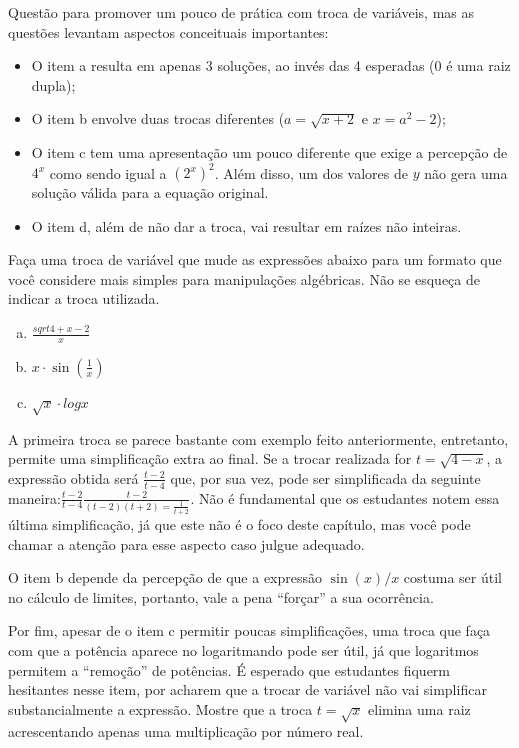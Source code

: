 \documentclass[main_estudante.tex]{subfiles}
\begin{document}
Questão para promover um pouco de prática com troca de variáveis, mas as questões levantam aspectos conceituais importantes:
\begin{itemize}
 \item O item a resulta em apenas 3 soluções, ao invés das 4 esperadas ($0$ é uma raiz dupla);
 \item O item b envolve duas trocas diferentes ($a=\sqrt{x+2}$ e $x=a^2-2$);
 \item O item c tem uma apresentação um pouco diferente que exige a percepção de $4^x$ como sendo igual a $(2^x)^2$. Além disso, um dos valores de $y$ não gera uma solução válida para a equação original.
 \item O item d, além de não dar a troca, vai resultar em raízes não inteiras.
\end{itemize}

\begin{questao}
Faça uma troca de variável que mude as expressões abaixo para um formato que você considere mais simples para manipulações algébricas. Não se esqueça de indicar a troca utilizada.
\begin{enumerate}[a)]
\item $\frac{sqrt{4+x}-2}{x}$
\item $x \cdot \sin(\frac{1}{x})$
\item $\sqrt{x} \cdot log x$
\end{enumerate}
\end{questao}

A primeira troca se parece bastante com  exemplo feito anteriormente, entretanto, permite uma simplificação extra ao final. Se a trocar realizada for $t=\sqrt{4-x}$, a expressão obtida será $\frac{t-2}{t-4}$ que, por sua vez, pode ser simplificada da seguinte maneira:$\frac{t-2}{t-4}\frac{t-2}{(t-2)(t+2)=\frac{1}{t+2}}$. Não é fundamental que os estudantes notem essa última simplificação, já que este não é o foco deste capítulo, mas você pode chamar a atenção para esse aspecto caso julgue adequado.

O item b depende da percepção de que a expressão $\sin(x)/x$ costuma ser útil no cálculo de limites, portanto, vale a pena ``forçar'' a sua ocorrência.

Por fim, apesar de o item c permitir poucas simplificações, uma troca que faça com que a potência aparece no logaritmando pode ser útil, já que logaritmos permitem a ``remoção'' de potências. É esperado que estudantes fiquerm hesitantes nesse item, por acharem que a trocar de variável não vai simplificar substancialmente a expressão. Mostre que a troca $t=\sqrt{x}$ elimina uma raiz acrescentando apenas uma multiplicação por número real.
\end{document}
